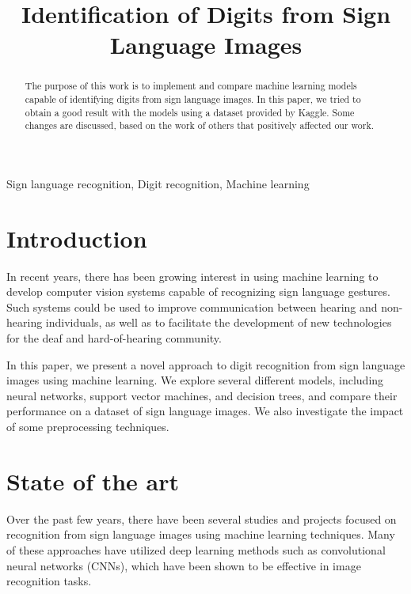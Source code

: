 \documentclass[conference]{IEEEtran}
\begin{document}
\title{Identification of Digits from Sign Language Images}

\author{
\and
{}
}

\maketitle

\begin{abstract}
    The purpose of this work is to implement and
    compare machine learning models capable of identifying digits from sign language images.
    In this paper, we tried to obtain a good result with the models using
    a dataset provided by Kaggle. Some changes are discussed,
    based on the work of others that positively affected our
    work.
\end{abstract}

\begin{IEEEkeywords}
Sign language recognition, Digit recognition, Machine learning
\end{IEEEkeywords}

\section{Introduction}
In recent years, there has been growing interest in using machine learning to develop computer vision systems capable of recognizing sign language gestures. Such systems could be used to improve communication between hearing and non-hearing individuals, as well as to facilitate the development of new technologies for the deaf and hard-of-hearing community.

In this paper, we present a novel approach to digit recognition from sign language images using machine learning. We explore several different models, including neural networks, support vector machines, and decision trees, and compare their performance on a dataset of sign language images. We also investigate the impact of some preprocessing techniques.

\section{State of the art}
Over the past few years, there have been several studies and projects focused on recognition from sign language images using machine learning techniques. Many of these approaches have utilized deep learning methods such as convolutional neural networks (CNNs), which have been shown to be effective in image recognition tasks.
\end{document}
